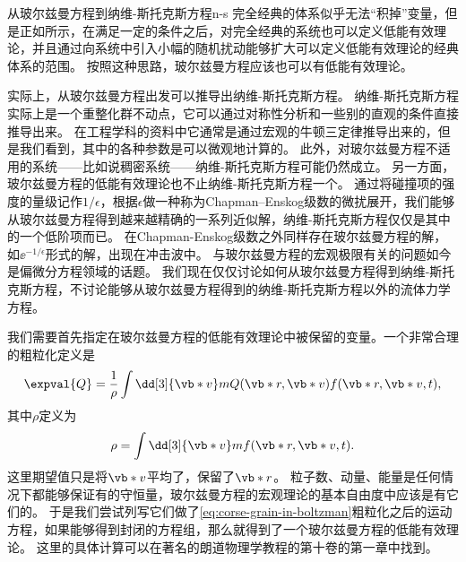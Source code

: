 \begin{back}{从玻尔兹曼方程到纳维-斯托克斯方程}{n-s}
    完全经典的体系似乎无法“积掉”变量，但是正如\cite{reall2021effective}所示，在满足一定的条件之后，对完全经典的系统也可以定义低能有效理论，并且通过向系统中引入小幅的随机扰动能够扩大可以定义低能有效理论的经典体系的范围。
    按照这种思路，玻尔兹曼方程应该也可以有低能有效理论。

    实际上，从玻尔兹曼方程出发可以推导出纳维-斯托克斯方程。
    纳维-斯托克斯方程实际上是一个重整化群不动点，它可以通过对称性分析和一些别的直观的条件直接推导出来\cite{Visscher_1985}。
    在工程学科的资料中它通常是通过宏观的牛顿三定律推导出来的，但是我们看到，其中的各种参数是可以微观地计算的。
    此外，对玻尔兹曼方程不适用的系统——比如说稠密系统——纳维-斯托克斯方程可能仍然成立。
    另一方面，玻尔兹曼方程的低能有效理论也不止纳维-斯托克斯方程一个。
    通过将碰撞项的强度的量级记作$1/\epsilon$，根据$\epsilon$做一种称为Chapman–Enskog级数的微扰展开\cite{chapman_mathematical_1990}，我们能够从玻尔兹曼方程得到越来越精确的一系列近似解，纳维-斯托克斯方程仅仅是其中的一个低阶项而已。
    在Chapman-Enskog级数之外同样存在玻尔兹曼方程的解，如$\ee^{- 1 / \epsilon}$形式的解，出现在冲击波中。    
    与玻尔兹曼方程的宏观极限有关的问题如今是偏微分方程领域的话题。
    我们现在仅仅讨论如何从玻尔兹曼方程得到纳维-斯托克斯方程，不讨论能够从玻尔兹曼方程得到的纳维-斯托克斯方程以外的流体力学方程。

    我们需要首先指定在玻尔兹曼方程的低能有效理论中被保留的变量。一个非常合理的粗粒化定义是
    \begin{equation}
        \expval{Q} = \frac{1}{\rho} \int \dd[3]{\vb*{v}} m Q(\vb*{r}, \vb*{v}) f(\vb*{r}, \vb*{v}, t),
        \label{eq:corse-grain-in-boltzman}
    \end{equation}
    其中$\rho$定义为
    \begin{equation}
        \rho = \int \dd[3]{\vb*{v}} m f(\vb*{r}, \vb*{v}, t).
    \end{equation}
    这里期望值只是将$\vb*{v}$平均了，保留了$\vb*{r}$。
    粒子数、动量、能量是任何情况下都能够保证有的守恒量，玻尔兹曼方程的宏观理论的基本自由度中应该是有它们的。
    于是我们尝试列写它们做了\eqref{eq:corse-grain-in-boltzman}粗粒化之后的运动方程，如果能够得到封闭的方程组，那么就得到了一个玻尔兹曼方程的低能有效理论。
    这里的具体计算可以在著名的朗道物理学教程的第十卷\cite{lifsic_physical_2008}的第一章中找到。


\end{back}
